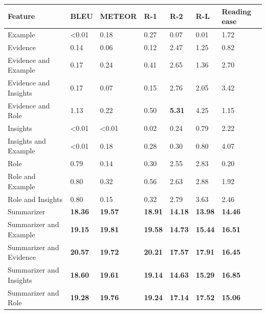 \begin{tabular}{|l|l|l|l|l|l|l|}
\hline
\textbf{Feature} & BLEU & METEOR & R-1 & R-2 & R-L & Reading ease \\
 \hline
 Example & \textless{}0.01 & 0.18 & 0.27 & 0.07 & 0.01 & 1.72 \\
 \hline
 Evidence & 0.14 & 0.06 & 0.12 & 2.47 & 1.25 & 0.82 \\
 \hline
 Evidence and Example & 0.17 & 0.24 & 0.41 & 2.65 & 1.36 & 2.70 \\
 \hline
 Evidence and Insights & 0.17 & 0.07 & 0.15 & 2.76 & 2.05 & 3.42 \\
 \hline
 Evidence and Role & 1.13 & 0.22 & 0.50 & \textbf{5.31} & 4.25 & 1.15 \\
 \hline
 Insights & \textless{}0.01 & \textless{}0.01 & 0.02 & 0.24 & 0.79 & 2.22 \\
 \hline
 Insights and Example & \textless{}0.01 & 0.18 & 0.28 & 0.30 & 0.80 & 4.07 \\
 \hline
 Role & 0.79 & 0.14 & 0.30 & 2.55 & 2.83 & 0.20 \\
 \hline
 Role and Example & 0.80 & 0.32 & 0.56 & 2.63 & 2.88 & 1.92 \\
 \hline
 Role and Insights & 0.80 & 0.15 & 0.32 & 2.79 & 3.63 & 2.46 \\
 \hline
 Summarizer & \textbf{18.36} & \textbf{19.57} & \textbf{18.91} & \textbf{14.18} & \textbf{13.98} & \textbf{14.46} \\
 \hline
 Summarizer and Example & \textbf{19.15} & \textbf{19.81} & \textbf{19.58} & \textbf{14.73} & \textbf{15.44} & \textbf{16.51} \\
 \hline
 Summarizer and Evidence & \textbf{20.57} & \textbf{19.72} & \textbf{20.21} & \textbf{17.57} & \textbf{17.91} & \textbf{16.45} \\
 \hline
 Summarizer and Insights & \textbf{18.60} & \textbf{19.61} & \textbf{19.14} & \textbf{14.63} & \textbf{15.29} & \textbf{16.85} \\
 \hline
 Summarizer and Role & \textbf{19.28} & \textbf{19.76} & \textbf{19.24} & \textbf{17.14} & \textbf{17.52} & \textbf{15.06} \\
\hline
\end{tabular}
